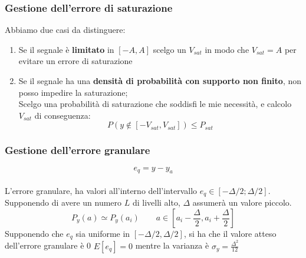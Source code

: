\documentclass{article}
\begin{document}
\subsubsection{Gestione dell'errore di saturazione}
Abbiamo due casi da distinguere:
\begin{enumerate}
	\item Se il segnale è \textbf{limitato} in $[-A,A]$ scelgo un $V_{sat}$ in modo che $V_{sat}=A$ per evitare un errore di saturazione
	\item Se il segnale ha una \textbf{densità di probabilità con supporto non finito}, non posso impedire la saturazione;\\
	Scelgo una probabilità di saturazione che soddisfi le mie necessità, e calcolo $V_{sat}$ di conseguenza:$$P(y\not\in[-V_{sat},V_{sat}])\leq P_{sat}$$
\end{enumerate}

\subsubsection{Gestione dell'errore granulare}
\begin{center}
\end{center}
$$e_q=y-y_a$$\\
L'errore granulare, ha valori all'interno dell'intervallo $e_q\in[-\Delta/2;\Delta/2]$.
Supponendo di avere un numero $L$ di livelli alto, $\Delta$ assumerà un valore piccolo.
$$P_y(a)\simeq P_y(a_i)\qquad a\in[a_i-\frac{\Delta}{2},a_i+\frac{\Delta}{2}]$$
Supponendo che $e_q$ sia uniforme in $[-\Delta/2,\Delta/2]$, si ha che il valore atteso dell'errore granulare è 0 $E[e_q]=0$ mentre la varianza è $\sigma_y=\frac{\Delta^2}{12}$
\end{document}
